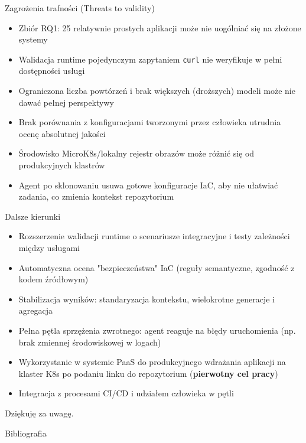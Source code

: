 \documentclass[aspectratio=169]{beamer}
\begin{document}
\begin{frame}{Zagrożenia trafności (Threats to validity)}
    \begin{itemize}
        \item Zbiór RQ1: 25 relatywnie prostych aplikacji może nie uogólniać się na złożone systemy
        \item Walidacja runtime pojedynczym zapytaniem \texttt{curl} nie weryfikuje w pełni dostępności usługi
        \item Ograniczona liczba powtórzeń i brak większych (droższych) modeli może nie dawać pełnej perspektywy
        \item Brak porównania z konfiguracjami tworzonymi przez człowieka utrudnia ocenę absolutnej jakości
        \item Środowisko MicroK8s/lokalny rejestr obrazów może różnić się od produkcyjnych klastrów
        \item Agent po sklonowaniu usuwa gotowe konfiguracje IaC, aby nie ułatwiać zadania, co zmienia kontekst repozytorium
    \end{itemize}
\end{frame}

\begin{frame}{Dalsze kierunki}
    \begin{itemize}
        \item Rozszerzenie walidacji runtime o scenariusze integracyjne i testy zależności między usługami
        \item Automatyczna ocena "bezpieczeństwa" IaC (reguły semantyczne, zgodność z kodem źródłowym)
        \item Stabilizacja wyników: standaryzacja kontekstu, wielokrotne generacje i agregacja
        \item Pełna pętla sprzężenia zwrotnego: agent reaguje na błędy uruchomienia (np. brak zmiennej środowiskowej w logach)
        \item Wykorzystanie w systemie PaaS do produkcyjnego wdrażania aplikacji na klaster K8s po podaniu linku do repozytorium (\textbf{pierwotny cel pracy})
        \item Integracja z procesami CI/CD i udziałem człowieka w pętli
    \end{itemize}
\end{frame}

\begin{frame}{}
    \centering
    \large Dziękuję za uwagę.
\end{frame}

\begin{frame}[allowframebreaks]{Bibliografia}
    \printbibliography
\end{frame}
\end{document}
